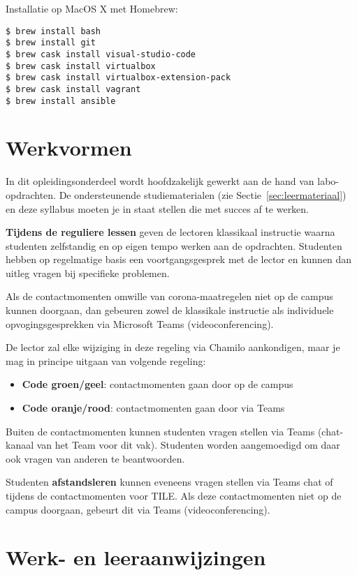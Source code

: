 Installatie op MacOS X met Homebrew:

\begin{verbatim}
$ brew install bash
$ brew install git
$ brew cask install visual-studio-code
$ brew cask install virtualbox
$ brew cask install virtualbox-extension-pack
$ brew cask install vagrant
$ brew install ansible
\end{verbatim}

\section{Werkvormen}%
\label{sec:werkvormen}

In dit opleidingsonderdeel wordt hoofdzakelijk gewerkt aan de hand van labo-op\-drach\-ten. De ondersteunende studiematerialen (zie Sectie~\ref{sec:leermateriaal}) en deze syllabus moeten je in staat stellen die met succes af te werken.

\textbf{Tijdens de reguliere lessen} geven de lectoren klassikaal instructie waarna studenten zelfstandig en op eigen tempo werken aan de opdrachten. Studenten hebben op regelmatige basis een voortgangsgesprek met de lector en kunnen dan uitleg vragen bij specifieke problemen.

Als de contactmomenten omwille van corona-maatregelen niet op de campus kunnen doorgaan, dan gebeuren zowel de klassikale instructie als individuele opvogingsgesprekken via Microsoft Teams (videoconferencing).

De lector zal elke wijziging in deze regeling via Chamilo aankondigen, maar je mag in principe uitgaan van volgende regeling:

\begin{itemize}
  \item \textbf{Code groen/geel}: contactmomenten gaan door op de campus
  \item \textbf{Code oranje/rood}: contactmomenten gaan door via Teams
\end{itemize}

Buiten de contactmomenten kunnen studenten vragen stellen via Teams (chat-kanaal van het Team voor dit vak). Studenten worden aangemoedigd om daar ook vragen van anderen te beantwoorden.

Studenten \textbf{afstandsleren} kunnen eveneens vragen stellen via Teams chat of tijdens de contactmomenten voor TILE\@. Als deze contactmomenten niet op de campus doorgaan, gebeurt dit via Teams (videoconferencing).

\section{Werk- en leeraanwijzingen}%
\label{sec:werk-en-leeraanwijzingen}

